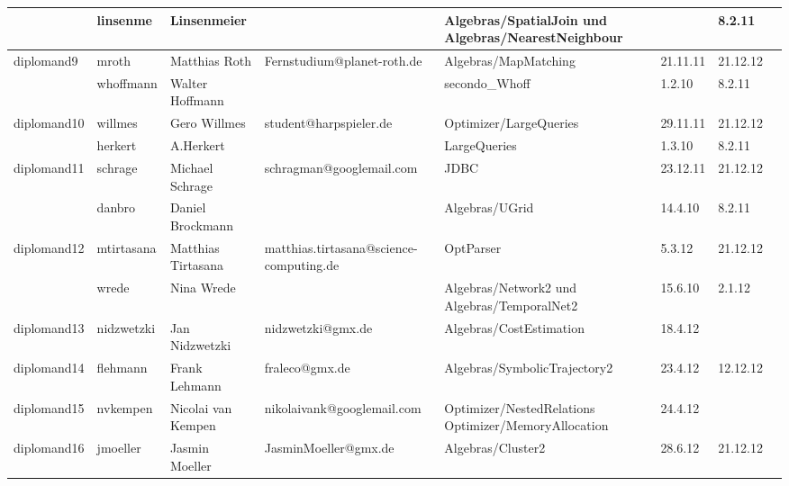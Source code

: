 \documentclass[a4paper,9pt,landscape]{scrartcl}
\begin{document}
\begin{table}
\begin{tabularx}{\textwidth}{|l|l|l|l|l|X|l|l|}
\cline{2-7}
\cellcolor{red}             &linsenme                 &Linsenmeier       &                   &Algebras/SpatialJoin und Algebras/NearestNeighbour& &8.2.11\\
\hline
\hline
\cellcolor{green}diplomand9 &mroth                    &Matthias Roth     &Fernstudium@planet-roth.de&Algebras/MapMatching   &21.11.11    &21.12.12\\
\cline{2-7}
\cellcolor{green}           &whoffmann                &Walter Hoffmann   &                    &secondo\_Whoff               &1.2.10      &8.2.11\\
\hline
\hline
\cellcolor{green}diplomand10&willmes                  &Gero Willmes      &student@harpspieler.de&Optimizer/LargeQueries     &29.11.11     &21.12.12\\
\cline{2-7}
\cellcolor{green}           &herkert                  &A.Herkert         &                   &LargeQueries                  &1.3.10       &8.2.11\\
\hline
\hline
\cellcolor{green}diplomand11&schrage                  &Michael Schrage   &schragman@googlemail.com&JDBC                     &23.12.11     &21.12.12\\
\cline{2-7}
\cellcolor{green}           &danbro                   &Daniel Brockmann  &                   &Algebras/UGrid                &14.4.10       &8.2.11\\
\hline
\hline
\cellcolor{green}diplomand12&mtirtasana               &Matthias Tirtasana&matthias.tirtasana@science-computing.de&OptParser &5.3.12       &21.12.12\\
\cline{2-7}
\cellcolor{green}           &wrede                    &Nina Wrede        &                    &Algebras/Network2 und Algebras/TemporalNet2&15.6.10&2.1.12\\
\hline
\hline
\rowcolor{yellow}\cellcolor{green}diplomand13& nidzwetzki&Jan Nidzwetzki    &nidzwetzki@gmx.de   &Algebras/CostEstimation        &18.4.12   &\\
\hline
\hline
\cellcolor{green}diplomand14&flehmann                 &Frank Lehmann     &fraleco@gmx.de      &Algebras/SymbolicTrajectory2   &23.4.12   &12.12.12\\
\hline
\hline
\rowcolor{yellow}\cellcolor{red}diplomand15  & nvkempen                 &Nicolai van Kempen&nikolaivank@googlemail.com&Optimizer/NestedRelations Optimizer/MemoryAllocation&24.4.12&\\
\hline
\hline
\cellcolor{green}diplomand16&jmoeller                  &Jasmin Moeller    &JasminMoeller@gmx.de &Algebras/Cluster2      &28.6.12  &21.12.12\\

\end{tabularx}
\end{table}
\end{document}
